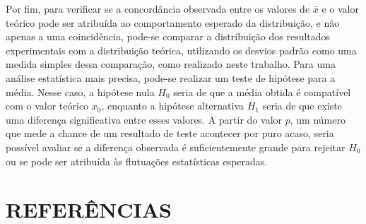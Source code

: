 \documentclass[12pt, a4paper, brazil]{article}
\begin{document}
Por fim, para verificar se a concordância observada entre os valores de $\bar{x}$ e o valor teórico pode ser atribuída ao comportamento esperado da distribuição, e não apenas a uma coincidência, pode-se comparar a distribuição dos resultados experimentais com a distribuição teórica, utilizando os desvios padrão como uma medida simples dessa comparação, como realizado neste trabalho. Para uma análise estatística mais precisa, pode-se realizar um teste de hipótese para a média. Nesse caso, a hipótese nula $H_0$ seria de que a média obtida é compatível com o valor teórico $x_0$, enquanto a hipótese alternativa $H_1$ seria de que existe uma diferença significativa entre esses valores. A partir do valor $p$, um número que mede a chance de um resultado de teste acontecer por puro acaso, seria possível avaliar se a diferença observada é suficientemente grande para rejeitar $H_0$ ou se pode ser atribuída às flutuações estatísticas esperadas.\cite{assis2020}
\newpage

\clearpage
\renewcommand{\refname}{}
\section{REFERÊNCIAS}
\vspace{-1.5\baselineskip}

\end{document}
